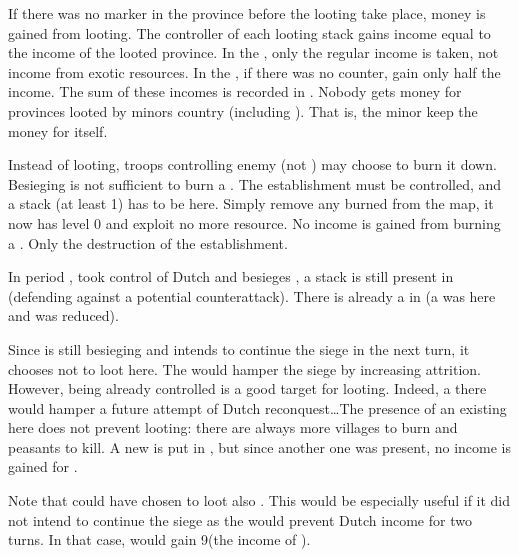 \bparag If there was no \PILLAGE marker in the province before the looting
take place, money is gained from looting.
\bparag The controller of each looting stack gains income equal to the income
of the looted province.
\bparag In the \ROTW, only the regular income is taken, not income from exotic
resources.
\bparag In the \ROTW, if there was no \ARMY counter, gain only half the
income.
\bparag The sum of these incomes is recorded in .
\bparag Nobody gets money for provinces looted by minors country (including
\VASSAL). That is, the minor keep the money for itself.

\aparag[Burning \TP]
\bparag Instead of looting, troops controlling enemy \TP (not \COL) may choose
to burn it down.
\bparag Besieging is not sufficient to burn a \TP. The establishment must be
controlled, and a stack (at least 1\LDE) has to be here.
\bparag Simply remove any burned \TP from the map, it now has level 0 and
exploit no more resource.
\bparag No income is gained from burning a \TP. Only the destruction of the
establishment.

\begin{exemple}[Looting]
  In period , \SPA took control of Dutch \provinceUtrecht and
  besieges \provinceZeeland, a stack is still present in \provinceUtrecht
  (defending against a potential counterattack). There is already a
  \PILLAGE\Facemoins in \provinceUtrecht (a \PILLAGE\Faceplus was here and was
  reduced).

  Since \SPA is still besieging \provinceZeeland and intends to continue the
  siege in the next turn, it chooses not to loot here. The \PILLAGE would
  hamper the siege by increasing attrition. However, \provinceUtrecht being
  already controlled is a good target for looting. Indeed, a \PILLAGE there
  would hamper a future attempt of Dutch reconquest\ldots The presence of an
  existing \PILLAGE here does not prevent looting: there are always more
  villages to burn and peasants to kill. A new \PILLAGE\Faceplus is put in
  \provinceUtrecht, but since another one was present, no income is gained for
  \SPA.

  Note that \SPA could have chosen to loot also \provinceZeeland. This would
  be especially useful if it did not intend to continue the siege as the
  \PILLAGE would prevent Dutch income for two turns. In that case, \SPA would
  gain 9\ducats (the income of \provinceZeeland).
\end{exemple}

